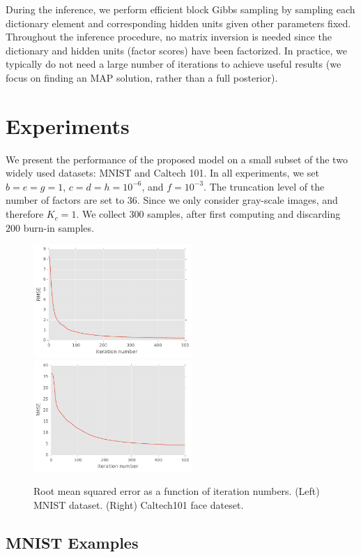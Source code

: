 \documentclass{article} %
\begin{document}
During the inference, we perform efficient block Gibbs sampling by sampling each dictionary element and corresponding hidden units given other parameters fixed. Throughout the inference procedure, no matrix inversion is needed since the dictionary and hidden units (factor scores) have been factorized. In practice, we typically do not need a large number of iterations to achieve useful results (we focus on finding an MAP solution, rather than a full posterior). 

\section{Experiments}
%
We present the performance of the proposed model on a small subset of the two widely used datasets: MNIST and Caltech 101. In all experiments, we set $b=e=g=1$, $c=d=h=10^{-6}$, and $f=10^{-3}$. The truncation level of the number of factors are set to $36$. Since we only consider gray-scale images, and therefore $K_c = 1$. We collect $300$ samples, after first computing and discarding $200$ burn-in samples.

\begin{figure}
   \centering
   \includegraphics[width=6cm]{figures/mnist_mse}  
   \includegraphics[width=6cm]{figures/face_mse} 
   \caption{\small{Root mean squared error as a function of iteration numbers. (Left) MNIST dataset. (Right) Caltech101 face dateset.}} \label{fig:mse}
\end{figure}

\subsection{MNIST Examples}
\end{document}
